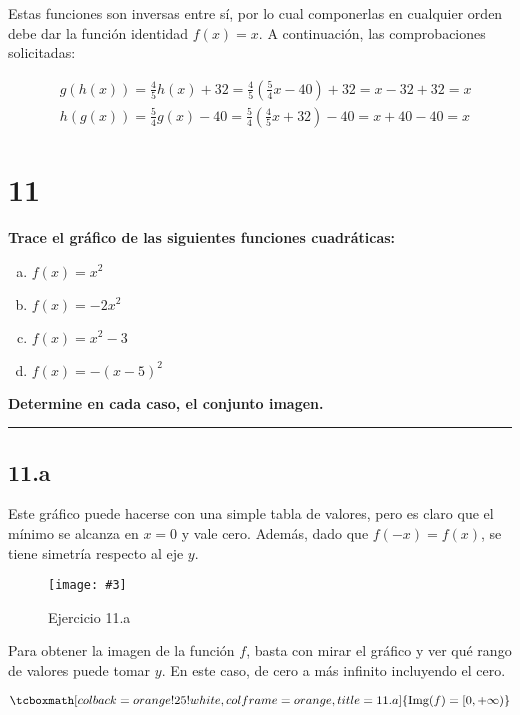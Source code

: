 \documentclass{article}
\newcommand{\hresult}[2]{\tcboxmath[colback=orange!25!white,colframe=orange, title=#1] {#2} }
\newcommand{\figurex}[4]{\begin{figure}[ht] \caption{#1} \texttt{[image: \#3]} \centering \label{#4}\end{figure}}
\newcommand{\sectionx}[1]{\section*{#1}\label{sec:#1}\addcontentsline{toc}{section}{\nameref{sec:#1}}}
\begin{document}
Estas funciones son inversas entre sí, por lo cual componerlas en cualquier orden debe dar la función identidad $f(x) = x$. A continuación, las comprobaciones solicitadas:

\begin{subequations}
\begin{align}
& g(h(x)) = \frac{4}{5} h(x) + 32 = \frac{4}{5} \left( \frac{5}{4} x - 40 \right) + 32 = x - 32 + 32 = x \\
& h(g(x)) = \frac{5}{4} g(x) - 40 = \frac{5}{4} \left( \frac{4}{5} x +32 \right) -40 = x + 40 - 40 = x
\end{align}
\end{subequations}

\sectionx{11}

\textbf{Trace el gráfico de las siguientes funciones cuadráticas:}

\begin{enumerate}[(a)]

\bfseries

\item $f(x) = x^2$

\item $f(x) = -2x^2$

\item $f(x) = x^2-3$

\item $f(x) = -(x-5)^2$

\end{enumerate}

\textbf{Determine en cada caso, el conjunto imagen.}
\vspace{1em}
\hrule

\subsection*{11.a}
\label{subsec:11.a}

Este gráfico puede hacerse con una simple tabla de valores, pero es claro que el mínimo se alcanza en $x = 0$ y vale cero. Además, dado que $f(-x) = f(x)$, se tiene simetría respecto al eje $y$.

\figurex{Ejercicio 11.a}{1.3}{../img/guide_01/ex_11a.png}{fig:11a}

Para obtener la imagen de la función $f$, basta con mirar el gráfico y ver qué rango de valores puede tomar $y$. En este caso, de cero a más infinito incluyendo el cero.

\begin{equation}
\hresult{11.a}{ \mathop{\text{Img}}(f) = [0, +\infty) }
\end{equation}
\end{document}
